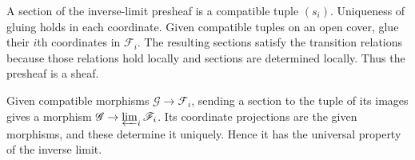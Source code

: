 A section of the inverse-limit presheaf is a compatible tuple $(s_i)$. Uniqueness of gluing holds in each coordinate. Given compatible tuples on an open cover, glue their $i$th coordinates in $\mathscr F_i$. The resulting sections satisfy the transition relations because those relations hold locally and sections are determined locally. Thus the presheaf is a sheaf.

Given compatible morphisms $\mathscr G\to\mathscr F_i$, sending a section to the tuple of its images gives a morphism $\mathscr G\to\varprojlim_i\mathscr F_i$. Its coordinate projections are the given morphisms, and these determine it uniquely. Hence it has the universal property of the inverse limit.
